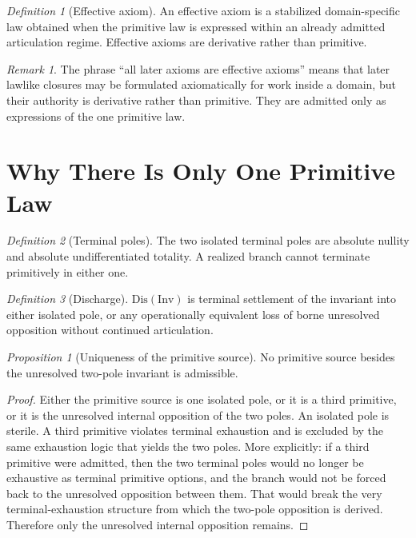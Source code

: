 \documentclass[11pt]{article}
\theoremstyle{definition}
\theoremstyle{plain}
\theoremstyle{remark}
\newtheorem{proposition}{Proposition}
\newtheorem{definition}{Definition}
\newtheorem{remark}{Remark}
\newcommand{\Inv}{\mathrm{Inv}}
\newcommand{\Dis}{\mathrm{Dis}}
\begin{document}
\begin{definition}[Effective axiom]
An effective axiom is a stabilized domain-specific law obtained when the primitive law is expressed within an already admitted articulation regime. Effective axioms are derivative rather than primitive.
\end{definition}

\begin{remark}
The phrase ``all later axioms are effective axioms'' means that later lawlike closures may be formulated axiomatically for work inside a domain, but their authority is derivative rather than primitive. They are admitted only as expressions of the one primitive law.
\end{remark}

\section{Why There Is Only One Primitive Law}

\begin{definition}[Terminal poles]
The two isolated terminal poles are absolute nullity and absolute undifferentiated totality. A realized branch cannot terminate primitively in either one.
\end{definition}

\begin{definition}[Discharge]
\label{def:discharge}
$\Dis(\Inv)$ is terminal settlement of the invariant into either isolated pole, or any operationally equivalent loss of borne unresolved opposition without continued articulation.
\end{definition}

\begin{proposition}[Uniqueness of the primitive source]
No primitive source besides the unresolved two-pole invariant is admissible.
\end{proposition}

\begin{proof}
Either the primitive source is one isolated pole, or it is a third primitive, or it is the unresolved internal opposition of the two poles. An isolated pole is sterile. A third primitive violates terminal exhaustion and is excluded by the same exhaustion logic that yields the two poles. More explicitly: if a third primitive were admitted, then the two terminal poles would no longer be exhaustive as terminal primitive options, and the branch would not be forced back to the unresolved opposition between them. That would break the very terminal-exhaustion structure from which the two-pole opposition is derived. Therefore only the unresolved internal opposition remains. 
\end{proof}
\end{document}
